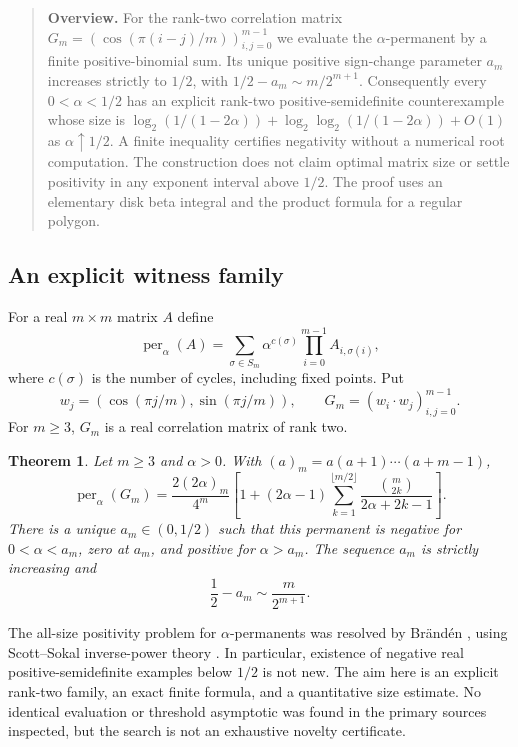 \documentclass[11pt,a4paper]{article}
\newtheorem{theorem}{Theorem}[section]
\theoremstyle{definition}\newtheorem{definition}[theorem]{Definition}
\theoremstyle{remark}\newtheorem{remark}[theorem]{Remark}
\numberwithin{equation}{section}
\begin{document}
\begin{quote}\small\textbf{Overview.} For the rank-two correlation matrix $G_m=(\cos(\pi(i-j)/m))_{i,j=0}^{m-1}$ we evaluate the $\alpha$-permanent by a finite positive-binomial sum. Its unique positive sign-change parameter $a_m$ increases strictly to $1/2$, with $1/2-a_m\sim m/2^{m+1}$. Consequently every $0<\alpha<1/2$ has an explicit rank-two positive-semidefinite counterexample whose size is $\log_2(1/(1-2\alpha))+\log_2\log_2(1/(1-2\alpha))+O(1)$ as $\alpha\uparrow1/2$. A finite inequality certifies negativity without a numerical root computation. The construction does not claim optimal matrix size or settle positivity in any exponent interval above $1/2$. The proof uses an elementary disk beta integral and the product formula for a regular polygon.\end{quote}
\subsection{An explicit witness family}\label{S07-sec-1}
For a real $m\times m$ matrix $A$ define
\[
 \operatorname{per}_{\alpha}(A)
 =\sum_{\sigma\in S_m}\alpha^{c(\sigma)}\prod_{i=0}^{m-1}A_{i,\sigma(i)},
\]
where $c(\sigma)$ is the number of cycles, including fixed points. Put
\[
 w_j=(\cos(\pi j/m),\sin(\pi j/m)),\qquad
 G_m=(w_i\cdot w_j)_{i,j=0}^{m-1}.
\]
For $m\ge3$, $G_m$ is a real correlation matrix of rank two.
\begin{theorem}\label{S07-exact}
Let $m\ge3$ and $\alpha>0$. With $(a)_m=a(a+1)\cdots(a+m-1)$,
\begin{equation}\label{S07-formula}
 \operatorname{per}_\alpha(G_m)
 =\frac{2(2\alpha)_m}{4^m}
 \left[1+(2\alpha-1)\sum_{k=1}^{\lfloor m/2\rfloor}
 \frac{\binom m{2k}}{2\alpha+2k-1}\right].
\end{equation}
There is a unique $a_m\in(0,1/2)$ such that this permanent is negative for $0<\alpha<a_m$, zero at $a_m$, and positive for $\alpha>a_m$. The sequence $a_m$ is strictly increasing and
\begin{equation}\label{S07-asym}
 \frac12-a_m\sim\frac{m}{2^{m+1}}.
\end{equation}
\end{theorem}
The all-size positivity problem for $\alpha$-permanents was resolved by Br\"and\'en \cite{ref009}, using Scott--Sokal inverse-power theory \cite{ref005}. In particular, existence of negative real positive-semidefinite examples below $1/2$ is not new. The aim here is an explicit rank-two family, an exact finite formula, and a quantitative size estimate. No identical evaluation or threshold asymptotic was found in the primary sources inspected, but the search is not an exhaustive novelty certificate.
\end{document}

